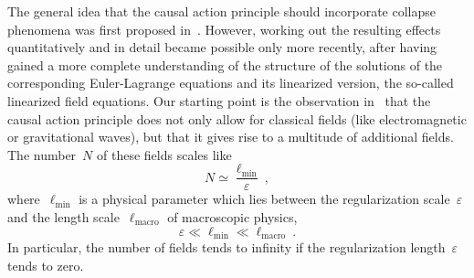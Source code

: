 \documentclass[reqno,11pt]{amsart}
\numberwithin{equation}{section}
\newcommand{\beq}{\begin{equation}}
\newcommand{\eeq}{\end{equation}}
\newcommand{\1}{\mathds{1}}
\begin{document}
The general idea that the causal action principle should incorporate collapse phenomena
was first proposed in~\cite[Chapter~5]{kleinerdr}. However, working out the resulting effects 
quantitatively and in detail became possible only more recently, after having gained a more complete
understanding of the structure of the solutions of the corresponding Euler-Lagrange equations
and its linearized version, the so-called linearized field equations.
Our starting point is the observation in~\cite{nonlocal} that the causal action principle
does not only allow for classical fields (like electromagnetic or gravitational waves),
but that it gives rise to a multitude of additional fields. The number~$N$ of these fields scales like
\beq \label{Nscaleintro}
N \simeq \frac{\ell_{\min}}{\varepsilon} \:,
\eeq
where~$\ell_{\min}$ is a physical parameter which lies between the regularization scale~$\varepsilon$ and the
length scale~$\ell_\text{macro}$ of macroscopic physics,
\beq \label{ellmindef}
\varepsilon \ll \ell_{\min} \ll \ell_\text{macro} \:.
\eeq
In particular, the number of fields tends to infinity if the regularization length~$\varepsilon$ tends to zero.
\end{document}
